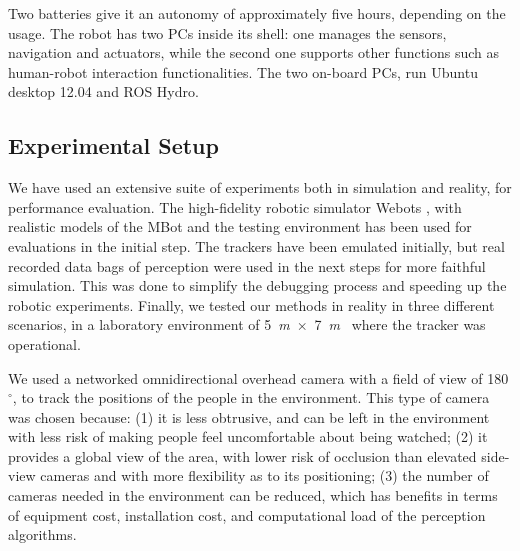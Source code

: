Two batteries give it an autonomy of approximately five hours, depending on the usage.
The robot has two PCs inside its shell: one manages the sensors, navigation and actuators, while the second one supports other functions such as human-robot interaction functionalities.%
 The two on-board PCs, run Ubuntu desktop 12.04 and ROS Hydro. 


\subsection{Experimental Setup}
\label{sec:Experimental_setup}

We have used an extensive suite of experiments both in simulation and reality, for performance evaluation. The high-fidelity robotic simulator Webots \cite{michel1998webots}, with realistic models of the MBot and the testing environment has been used for evaluations in the initial step. The trackers have been emulated initially, but real recorded data bags of perception were used in the next steps for more faithful simulation. This was done to simplify the debugging process and speeding up the robotic experiments. %
Finally, we tested our methods in reality in three different scenarios, in a laboratory environment of 5~\textit{m}~$\times$~7~\textit{m}%
~where the tracker was operational.
 

We used a networked omnidirectional overhead camera with a field of view of 180$^{\circ}$, to track the positions of the people in the environment. This type of camera was chosen because: (1) it is less obtrusive, and can be left in the environment with less risk of making people feel uncomfortable about being watched; 
(2) it provides a global view of the area, with lower risk of occlusion than elevated side-view cameras and with more flexibility as to its positioning; (3) the number of cameras needed in the environment can be reduced, which has benefits in terms of equipment cost, installation cost, and computational load of the perception algorithms. 


